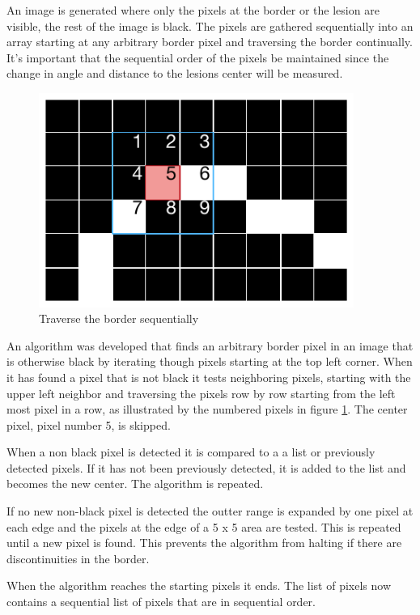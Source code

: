 An image is generated where only the pixels at the border or the lesion are visible, the rest of the image is black. The pixels are gathered sequentially into an array starting at any arbitrary border pixel and traversing the border continually. It's important that the sequential order of the pixels be maintained since the change in angle and distance to the lesions center will be measured.

\begin{figure}[H]
    \centering
    \includegraphics[height=7cm,keepaspectratio]{assets/border/travers_grid.pdf}
    \caption{Traverse the border sequentially}
    \label{fig:tra_border}
\end{figure}

An algorithm was developed that finds an arbitrary border pixel in an image that is otherwise black by iterating though pixels starting at the top left corner. When it has found a pixel that is not black it tests neighboring pixels, starting with the upper left neighbor and traversing the pixels row by row starting from the left most pixel in a row, as illustrated by the numbered pixels in figure \ref{fig:tra_border}. The center pixel, pixel number 5, is skipped.

When a non black pixel is detected it is compared to a a list or previously detected pixels. If it has not been previously detected, it is added to the list and becomes the new center. The algorithm is repeated.

If no new non-black pixel is detected the outter range is expanded by one pixel at each edge and the pixels at the edge of a 5 x 5 area are tested. This is repeated until a new pixel is found. This prevents the algorithm from halting if there are discontinuities in the border.

When the algorithm reaches the starting pixels it ends. The list of pixels now contains a sequential list of pixels that are in sequential order.

